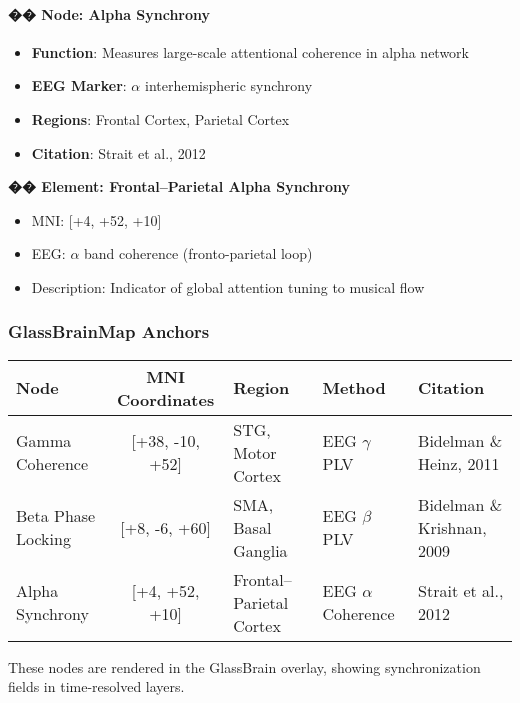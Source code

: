 \paragraph{�� Node: Alpha Synchrony}

\begin{itemize}
    \item \textbf{Function}: Measures large-scale attentional coherence in alpha network
    \item \textbf{EEG Marker}: $\alpha$ interhemispheric synchrony
    \item \textbf{Regions}: Frontal Cortex, Parietal Cortex
    \item \textbf{Citation}: Strait et al., 2012
\end{itemize}

\textbf{�� Element: Frontal–Parietal Alpha Synchrony}

\begin{itemize}
    \item MNI: [+4, +52, +10]
    \item EEG: $\alpha$ band coherence (fronto-parietal loop)
    \item Description: Indicator of global attention tuning to musical flow
\end{itemize}

\subsubsection*{GlassBrainMap Anchors}

\begin{center}
\begin{tabular}{|l|c|l|l|l|}
\hline
\textbf{Node} & \textbf{MNI Coordinates} & \textbf{Region} & \textbf{Method} & \textbf{Citation} \\
\hline
Gamma Coherence & [+38, -10, +52] & STG, Motor Cortex & EEG $\gamma$ PLV & Bidelman \& Heinz, 2011 \\
Beta Phase Locking & [+8, -6, +60] & SMA, Basal Ganglia & EEG $\beta$ PLV & Bidelman \& Krishnan, 2009 \\
Alpha Synchrony & [+4, +52, +10] & Frontal–Parietal Cortex & EEG $\alpha$ Coherence & Strait et al., 2012 \\
\hline
\end{tabular}
\end{center}

These nodes are rendered in the GlassBrain overlay, showing synchronization fields in time-resolved layers.

